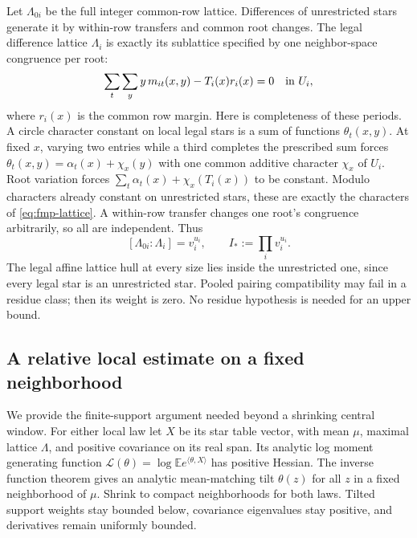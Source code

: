 Let $\Lambda_{0i}$ be the full integer common-row lattice. Differences
of unrestricted stars generate it by within-row transfers and common
root changes. The legal difference lattice $\Lambda_i$ is exactly
its sublattice specified by one neighbor-space congruence per root:
\begin{equation}\label{eq:fmp-lattice}
 \sum_t\sum_y y\,m_{it}(x,y)-T_i(x)r_i(x)=0\quad\hbox{in }U_i,
\end{equation}
where $r_i(x)$ is the common row margin. Here is completeness of these
periods. A circle character constant on local legal stars is a sum
of functions $\theta_t(x,y)$. At fixed $x$, varying two entries while
a third completes the prescribed sum forces
$\theta_t(x,y)=\alpha_t(x)+\chi_x(y)$ with one common additive
character $\chi_x$ of $U_i$. Root variation forces
$\sum_t\alpha_t(x)+\chi_x(T_i(x))$ to be constant. Modulo characters
already constant on unrestricted stars, these are exactly the
characters of \eqref{eq:fmp-lattice}. A within-row transfer changes
one root's congruence arbitrarily, so all are independent. Thus
\begin{equation}\label{eq:fmp-index}
 [\Lambda_{0i}:\Lambda_i]=v_i^{u_i},\qquad I_*:=\prod_i v_i^{u_i}.
\end{equation}
The legal affine lattice hull at every size lies inside the
unrestricted one, since every legal star is an unrestricted star.
Pooled pairing compatibility may fail in a residue class; then its
weight is zero. No residue hypothesis is needed for an upper bound.

\subsection{A relative local estimate on a fixed neighborhood}
We provide the finite-support argument needed beyond a shrinking
central window. For either local law let $X$ be its star table vector,
with mean $\mu$, maximal lattice $\Lambda$, and positive covariance
on its real span. Its analytic log moment generating function
$\mathcal L(\theta)=\log\mathbb E e^{\langle\theta,X\rangle}$ has
positive Hessian. The inverse function theorem gives an analytic
mean-matching tilt $\theta(z)$ for all $z$ in a fixed neighborhood
of $\mu$. Shrink to compact neighborhoods for both laws. Tilted
support weights stay bounded below, covariance eigenvalues stay
positive, and derivatives remain uniformly bounded.

